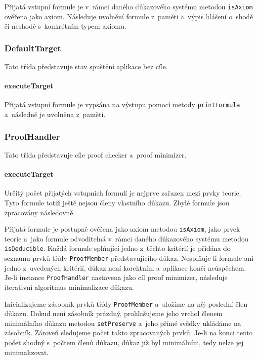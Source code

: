 \documentclass[thesis=B,czech,hidelinks]{thesis}[2012/06/26]
\begin{document}
Přijatá vstupní formule je v~rámci daného důkazového systému metodou \texttt{isAxiom} ověřena jako axiom. Následuje uvolnění formule z~paměti a~výpis hlášení o~shodě či neshodě s~konkrétním typem axiomu.

\subsubsection{DefaultTarget}

Tato třída představuje stav spuštění aplikace bez cíle.

\paragraph{executeTarget}

Přijatá vstupní formule je vypsána na výstupu pomocí metody \texttt{printFormula} a~následně je uvolněna z~paměti.

\subsubsection{ProofHandler}

Tato třída představuje cíle proof checker a~proof minimizer.

\paragraph{executeTarget}

Určitý počet přijatých vstupních formulí je nejprve zařazen mezi prvky teorie. Tyto formule totiž ještě nejsou členy vlastního důkazu. Zbylé formule jsou zpracovány následovně.

Přijatá formule je postupně ověřena jako axiom metodou \texttt{isAxiom}, jako prvek teorie a~jako formule odvoditelná v~rámci daného důkazového systému metodou \texttt{isDeducible}. Každá formule splňující jedno z~těchto kritérií je přidána do seznamu prvků třídy \texttt{ProofMember} představujícího důkaz. Nesplňuje-li formule ani jedno z~uvedených kritérií, důkaz není korektním a~aplikace končí neúspěchem. Je-li instance \texttt{ProofHandler} nastavena jako cíl proof minimizer, následuje iterativní algoritmus minimalizace důkazu.

Inicializujeme zásobník prvků třídy \texttt{ProofMember} a~uložíme na něj poslední člen důkazu. Dokud není zásobník prázdný, prohlašujeme jeho vrchol členem minimálního důkazu metodou \texttt{setPreserve} a~jeho přímé svědky ukládáme na zásobník. Zároveň sledujeme počet takto zpracovaných prvků. Je-li na konci tento počet shodný s~počtem členů důkazu, důkaz již byl minimálním, tedy nelze jej minimalizovat.
\end{document}
